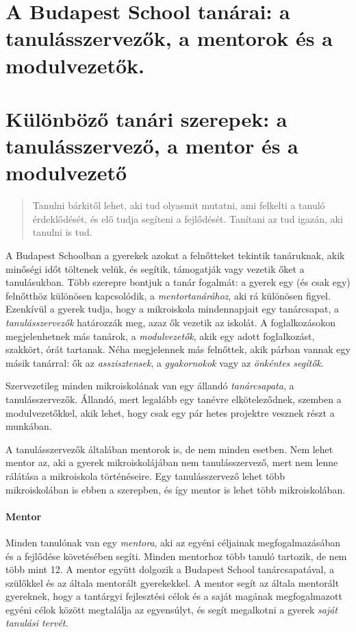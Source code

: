 \ifkerettanterv
  \section{A Budapest School tanárai: a tanulásszervezők, a mentorok és a
    modulvezetők.}
\else
  \section{Különböző tanári szerepek: a tanulásszervező, a mentor és a
    modulvezető}

\fi

\label{sec:tanarok}
\begin{quote}

  Tanulni bárkitől lehet, aki tud olyasmit mutatni, ami felkelti a tanuló
  érdeklődését, és elő tudja segíteni a fejlődését. Tanítani az tud igazán,
  aki tanulni is tud.
\end{quote}
A Budapest Schoolban a gyerekek azokat a felnőtteket tekintik tanáruknak, akik
minőségi időt töltenek velük, és segítik, támogatják vagy vezetik őket a
tanulásukban. Több szerepre bontjuk a tanár fogalmát: a gyerek egy (és csak
egy) felnőtthöz különösen kapcsolódik, a \emph{mentortanárához}, aki rá
különösen figyel. Ezenkívül a gyerek tudja, hogy a mikroiskola mindennapjait
egy tanárcsapat, a \emph{tanulásszervezők} határozzák meg, azaz ők vezetik az
iskolát.  A foglalkozásokon megjelenhetnek más tanárok, a \emph{modulvezetők},
akik egy adott foglalkozást, szakkört, órát tartanak. Néha megjelennek más
felnőttek, akik párban vannak egy másik tanárral: ők az \emph{asszisztensek}, a
\emph{gyakornokok} vagy az \emph{önkéntes segítők}.

Szervezetileg minden mikroiskolának van egy állandó \emph{tanárcsapata}, a
tanulásszervezők. Állandó, mert legalább egy tanévre elköteleződnek, szemben a
modulvezetőkkel, akik lehet, hogy csak egy pár hetes projektre vesznek részt a
munkában.

A tanulásszervezők általában mentorok is, de nem minden esetben. Nem lehet
mentor az, aki a gyerek mikroiskolájában nem tanulásszervező, mert nem lenne
rálátása a mikroiskola történéseire. Egy tanulásszervező lehet több
mikroiskolában is ebben a szerepben, és így mentor is lehet több mikroiskolában.

\paragraph{Mentor}
Minden tanulónak van egy \emph{mentora}, aki az egyéni céljainak
megfogalmazásában és
a fejlődése követésében segíti. Minden mentorhoz több tanuló tartozik, de nem
több mint 12. A mentor együtt dolgozik a Budapest School tanárcsapatával, a
szülőkkel és az általa mentorált gyerekekkel. A mentor segít az általa
mentorált gyereknek, hogy a tantárgyi fejlesztési célok és
a
saját magának megfogalmazott egyéni célok között megtalálja  az egyensúlyt, és segít megalkotni a
gyerek \emph{saját
  tanulási tervét}.

